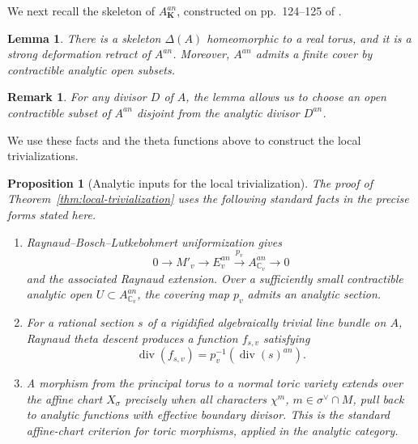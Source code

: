 \documentclass[10pt,a4paper]{amsart}
\theoremstyle{plain}
\newtheorem{proposition}[theorem]{Proposition}
\newtheorem{remark}[theorem]{Remark}
\theoremstyle{plain}
\newtheorem{lem}[thm]{Lemma}
\numberwithin{equation}{section}
\begin{document}
We next recall the skeleton of \(A^{an}_{\mathbf{K}}\), constructed on
pp.~124--125 of \cite{Ber}.
\begin{lem}
	There is a skeleton \(\Delta(A)\) homeomorphic to a real torus, and it is a
	strong deformation retract of \(A^{an}\).  Moreover, \(A^{an}\) admits a
	finite cover by contractible analytic open subsets.
\end{lem}
\begin{remark}
	For any divisor \(D\) of \(A\), the lemma allows us to choose an open
	contractible subset of \(A^{an}\) disjoint from the analytic divisor
	\(D^{an}\).
\end{remark}
We use these facts and the theta functions above to construct the local
trivializations.

\begin{proposition}[Analytic inputs for the local trivialization]\label{input:local-triv-analytic}
	The proof of Theorem~\ref{thm:local-trivialization} uses the following standard
	facts in the precise forms stated here.
	\begin{enumerate}[leftmargin=2em]
		\item Raynaud--Bosch--Lutkebohmert uniformization gives
		\[
		0\to M'_v\to E_v^{an}\xrightarrow{p_v}A_{\mathbb C_v}^{an}\to0
		\]
		and the associated Raynaud extension.  Over a sufficiently small contractible
		analytic open \(U\subset A_{\mathbb C_v}^{an}\), the covering map \(p_v\) admits
		an analytic section.
		\item For a rational section \(s\) of a rigidified algebraically trivial line
		bundle on \(A\), Raynaud theta descent produces a function \(f_{s,v}\) satisfying
		\[
		\operatorname{div}(f_{s,v})=p_v^{-1}(\operatorname{div}(s)^{an}).
		\]
		\item A morphism from the principal torus to a normal toric variety extends over
		the affine chart \(X_\sigma\) precisely when all characters
		\(\chi^m\), \(m\in\sigma^\vee\cap M\), pull back to analytic functions with
		effective boundary divisor.  This is the standard affine-chart criterion for
		toric morphisms, applied in the analytic category.
	\end{enumerate}
\end{proposition}
\end{document}
